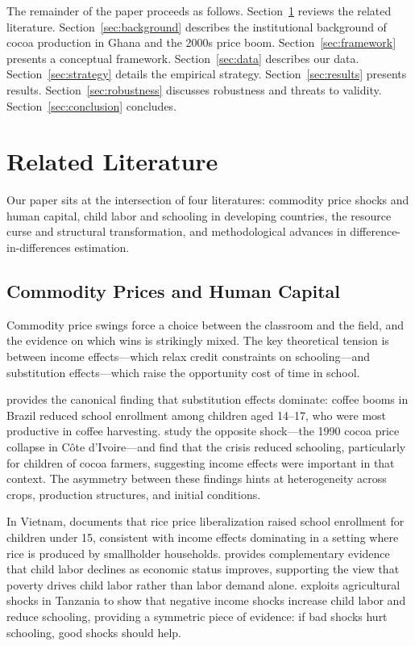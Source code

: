 \documentclass[12pt]{article}
\begin{document}
The remainder of the paper proceeds as follows. Section~\ref{sec:literature} reviews the related literature. Section~\ref{sec:background} describes the institutional background of cocoa production in Ghana and the 2000s price boom. Section~\ref{sec:framework} presents a conceptual framework. Section~\ref{sec:data} describes our data. Section~\ref{sec:strategy} details the empirical strategy. Section~\ref{sec:results} presents results. Section~\ref{sec:robustness} discusses robustness and threats to validity. Section~\ref{sec:conclusion} concludes.


\section{Related Literature}
\label{sec:literature}

Our paper sits at the intersection of four literatures: commodity price shocks and human capital, child labor and schooling in developing countries, the resource curse and structural transformation, and methodological advances in difference-in-differences estimation.

\subsection{Commodity Prices and Human Capital}

Commodity price swings force a choice between the classroom and the field, and the evidence on which wins is strikingly mixed. The key theoretical tension is between income effects---which relax credit constraints on schooling---and substitution effects---which raise the opportunity cost of time in school.

\citet{kruger2007} provides the canonical finding that substitution effects dominate: coffee booms in Brazil reduced school enrollment among children aged 14--17, who were most productive in coffee harvesting. \citet{cogneau2012} study the opposite shock---the 1990 cocoa price collapse in C\^{o}te d'Ivoire---and find that the crisis reduced schooling, particularly for children of cocoa farmers, suggesting income effects were important in that context. The asymmetry between these findings hints at heterogeneity across crops, production structures, and initial conditions.

In Vietnam, \citet{edmonds2005} documents that rice price liberalization raised school enrollment for children under 15, consistent with income effects dominating in a setting where rice is produced by smallholder households. \citet{edmonds2005b} provides complementary evidence that child labor declines as economic status improves, supporting the view that poverty drives child labor rather than labor demand alone. \citet{beegle2006} exploits agricultural shocks in Tanzania to show that negative income shocks increase child labor and reduce schooling, providing a symmetric piece of evidence: if bad shocks hurt schooling, good shocks should help.
\end{document}
